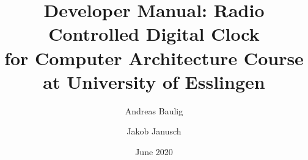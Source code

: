\documentclass[12pt,a4paper,hidelinks,oneside,english]{report}
\title{Developer Manual: Radio Controlled Digital Clock \\
\large for Computer Architecture Course at University of Esslingen}
\author{Andreas Baulig \and Jakob Janusch}
\date{June 2020}
\begin{document}
\maketitle{}

\tableofcontents

\listoffigures

\lstlistoflistings





\printbibliography
\end{document}
